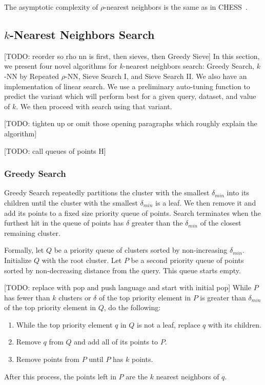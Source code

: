 The asymptotic complexity of $\rho$-nearest neighbors is the same as in CHESS~\cite{ishaq2019clustered}.

\subsection{\texorpdfstring{$k$}{k}-Nearest Neighbors Search}
\label{subsec:methods:knn-search}

[TODO: reorder so rho nn is first, then sieves, then Greedy Sieve]
In this section, we present four novel algorithms for $k$-nearest neighbors search: Greedy Search, $k$-NN by Repeated $\rho$-NN, Sieve Search I, and Sieve Search II. 
We also have an implementation of linear search. We use a preliminary auto-tuning function to predict the variant which will perform 
best for a given query, dataset, and value of $k$. We then proceed with search using that variant.  


[TODO: tighten up or omit those opening paragraphs which roughly explain the algorithm]


[TODO: call queues of points H]
\subsubsection{Greedy Search}
\label{subsubsec:methods:knn-search:greedy-search}
Greedy Search repeatedly partitions the cluster with the smallest $\delta_{min}$ into its children 
until the cluster with the smallest $\delta_{min}$ is a leaf. We then remove it and add its points to a fixed size priority queue of points. 
Search terminates when the furthest hit in the queue of points has $\delta$ greater than the $\delta_{min}$ of the closest remaining cluster.

Formally, let $Q$ be a priority queue of clusters sorted by non-increasing $\delta_{min}$. Initialize $Q$ with the root cluster.
Let $P$ be a second priority queue of points sorted by non-decreasing distance from the query. This queue starts empty.

[TODO: replace with pop and push language and start with initial pop]
While $P$ has fewer than $k$ clusters or $\delta$ of the top priority element in $P$ is greater 
than $\delta_{min}$ of the top priority element in $Q$, do the following:
\begin{enumerate}
\item While the top priority element $q$ in $Q$ is not a leaf, replace $q$ with its children.
\item Remove $q$ from $Q$ and add all of its points to $P$. 
\item Remove points from $P$ until $P$ has $k$ points. 
\end{enumerate}
After this process, the points left in $P$ are the $k$ nearest neighbors of $q$.

